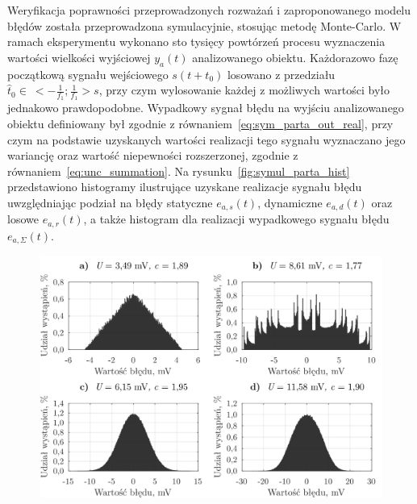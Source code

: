 Weryfikacja poprawności przeprowadzonych rozważań i zaproponowanego modelu błędów została przeprowadzona symulacyjnie, stosując metodę Monte-Carlo. W ramach eksperymentu wykonano sto tysięcy powtórzeń procesu wyznaczenia wartości wielkości wyjściowej $y_{a}(t)$ analizowanego obiektu. Każdorazowo fazę początkową sygnału wejściowego $s(t+t_{0})$ losowano z przedziału $\hat{t}_{0} \in~<-\frac{1}{f_{1}};\frac{1}{f_{1}}>\unit{s}$, przy czym wylosowanie każdej z możliwych wartości było jednakowo prawdopodobne. Wypadkowy sygnał błędu na wyjściu analizowanego obiektu definiowany był zgodnie z równaniem~\eqref{eq:sym_parta_out_real}, przy czym na podstawie uzyskanych wartości realizacji tego sygnału wyznaczano jego wariancję oraz wartość niepewności rozszerzonej, zgodnie z równaniem~\eqref{eq:unc_summation}. Na rysunku~\ref{fig:symul_parta_hist} przedstawiono histogramy ilustrujące uzyskane realizacje sygnału błędu uwzględniając podział na błędy statyczne $e_{a,s}(t)$, dynamiczne $e_{a,d}(t)$ oraz losowe $e_{a,r}(t)$, a także histogram dla realizacji wypadkowego sygnału błędu $e_{a,\Sigma}(t)$.

\begin{figure}[htb!]
\begin{center}
\includegraphics{obrazki/hist_part_a}
\end{center}
\end{figure}

